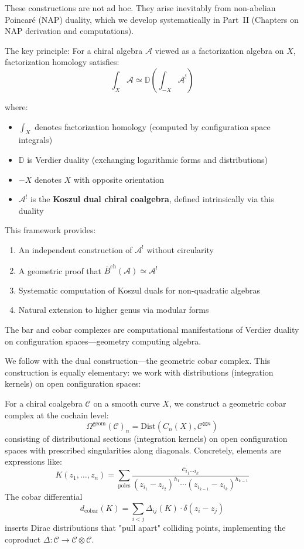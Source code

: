 \begin{remark}
\label{rem:NAP-foundation}
These constructions are not ad hoc. They arise inevitably from non-abelian Poincaré (NAP) duality, which we develop systematically in Part~II (Chapters on NAP derivation and computations).

The key principle: For a chiral algebra $\mathcal{A}$ viewed as a factorization algebra on $X$, factorization homology satisfies:
$$\int_X \mathcal{A} \simeq \mathbb{D}\left(\int_{-X} \mathcal{A}^!\right)$$

where:
\begin{itemize}
\item $\int_X$ denotes factorization homology (computed by configuration space integrals)
\item $\mathbb{D}$ is Verdier duality (exchanging logarithmic forms and distributions)
\item $-X$ denotes $X$ with opposite orientation
\item $\mathcal{A}^!$ is the \textbf{Koszul dual chiral coalgebra}, defined intrinsically via this duality
\end{itemize}

This framework provides:
\begin{enumerate}
\item An independent construction of $\mathcal{A}^!$ without circularity
\item A geometric proof that $\bar{B}^{\text{ch}}(\mathcal{A}) \simeq \mathcal{A}^!$
\item Systematic computation of Koszul duals for non-quadratic algebras
\item Natural extension to higher genus via modular forms
\end{enumerate}

The bar and cobar complexes are computational manifestations of Verdier duality on configuration spaces---geometry computing algebra.
\end{remark}

We follow with the dual construction—the geometric cobar complex. This construction is equally elementary: we work with distributions (integration kernels) on open configuration spaces:

\begin{theorem}
For a chiral coalgebra $\mathcal{C}$ on a smooth curve $X$, we construct a geometric cobar complex at the cochain level:
$$\Omega^{\text{geom}}(\mathcal{C})_n = \text{Dist}(C_n(X), \mathcal{C}^{\boxtimes n})$$
consisting of distributional sections (integration kernels) on open configuration spaces with prescribed singularities along diagonals. Concretely, elements are expressions like:
$$K(z_1, \ldots, z_n) = \sum_{\text{poles}} \frac{c_{i_1 \cdots i_k}}{(z_{i_1} - z_{i_2})^{h_1} \cdots (z_{i_{k-1}} - z_{i_k})^{h_{k-1}}}$$
The cobar differential
$$d_{\text{cobar}}(K) = \sum_{i<j} \Delta_{ij}(K) \cdot \delta(z_i - z_j)$$
inserts Dirac distributions that "pull apart" colliding points, implementing the coproduct $\Delta: \mathcal{C} \to \mathcal{C} \otimes \mathcal{C}$.
\end{theorem}

